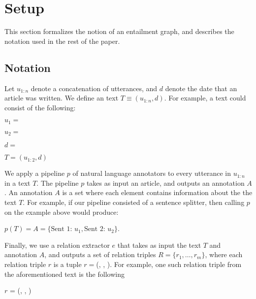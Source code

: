 \section{Setup}
This section formalizes the notion of an entailment graph, and describes
the notation used in the rest of the paper.
\subsection{Notation}
Let $u_{1:n}$ denote a concatenation of utterances, and 
$d$ denote the date that an article was written. We define
an text $T \equiv (u_{1:n}, d)$. For example, a text could consist
of the following:
\begin{description}

  \item $u_1 =$ 
  \item $u_2 =$ 
  \item $d =$  
  \item $T = (u_{1:2}, d)$
\end{description}

We apply a pipeline $p$ of natural language annotators 
to every utterance in $u_{1:n}$ in a text $T$. 
The pipeline $p$ takes as input an article, and outputs an annotation $A$.
An annotation $A$ is a set where each element contains
information about the the text $T$. For example, if our
pipeline consisted of a sentence splitter, then calling $p$
on the example above would produce:
\begin{center}
  $p(T) = A = \{\text{Sent 1: } u_1, \text{Sent 2: } u_2\}$.
\end{center}

Finally, we use a relation extractor $e$ that takes as input
the text $T$ and annotation $A$, and outputs a set of relation triples $R=\{r_1,\dots,r_m\}$,
where each relation triple $r$ is a tuple $r=$(, , ).
For example, one such relation triple from the aforementioned text is the following
\begin{center}
  $r$ = (, , )
\end{center}

